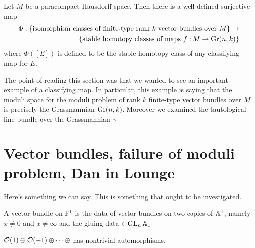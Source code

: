 \documentclass[12pt]{article}
\begin{document}

\hfill

\begin{theorem}
Let $M$ be a paracompact Hausdorff space. Then there is a well-defined surjective map \begin{align*}
    \Phi:\set{\text{isomorphism classes of finite-type rank $k$ vector bundles over $M$}}\to \\
    \set{\text{stable homotopy classes of maps $f: M\to \Gr(n,k)$}}
\end{align*} where $\Phi([E])$ is defined to be the stable homotopy class of any classifying map for $E$.
\end{theorem}

The point of reading this section was that we wanted to see an important example of a classifying map. In particular, this example is saying that the moduli space for the moduli problem of rank $k$ finite-type vector bundles over $M$ is precisely the Grassmannian $\Gr(n,k)$. Moreover we examined the tautological line bundle over the Grassmannian $\gamma$

\section{Vector bundles, failure of moduli problem, Dan in Lounge}
Here's something we can say.  This is something that ought to be investigated.


A vector bundle on $\P^1$ is the data of vector bundles on two copies of $\A^1$, namely $x\neq 0 $ and $x\neq \infty$ and the gluing data $\in\GL_n\A_1$

$\mc O(1)\oplus \mc O(-1) \oplus \dots \oplus$ has nontrivial automorphisms.
\end{document}
